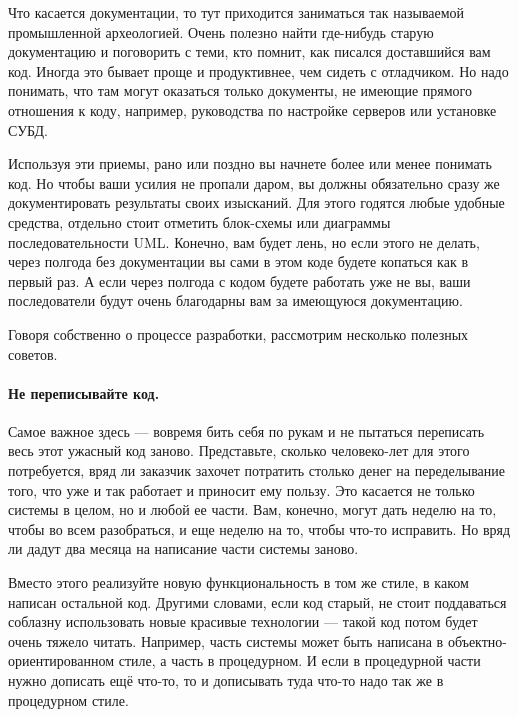 \documentclass{../../text-style}
\begin{document}
Что касается документации, то тут приходится заниматься так называемой промышленной археологией. Очень полезно найти где-нибудь старую документацию и поговорить с теми, кто помнит, как писался доставшийся вам код. Иногда это бывает проще и продуктивнее, чем сидеть с отладчиком. Но надо понимать, что там могут оказаться только документы, не имеющие прямого отношения к коду, например, руководства по настройке серверов или установке СУБД.

Используя эти приемы, рано или поздно вы начнете более или менее понимать код. Но чтобы ваши усилия не пропали даром, вы должны обязательно сразу же документировать результаты своих изысканий. Для этого годятся любые удобные средства, отдельно стоит отметить блок-схемы или диаграммы последовательности UML. Конечно, вам будет лень, но если этого не делать, через полгода без документации вы сами в этом коде будете копаться как в первый раз. А если через полгода с кодом будете работать уже не вы, ваши последователи будут очень благодарны вам за имеющуюся документацию.

Говоря собственно о процессе разработки, рассмотрим несколько полезных советов.

\paragraph{Не переписывайте код.} Самое важное здесь --- вовремя бить себя по рукам и не пытаться переписать весь этот ужасный код заново. Представьте, сколько человеко-лет для этого потребуется, вряд ли заказчик захочет потратить столько денег на переделывание того, что уже и так работает и приносит ему пользу. Это касается не только системы в целом, но и любой ее части. Вам, конечно, могут дать неделю на то, чтобы во всем разобраться, и еще неделю на то, чтобы что-то исправить. Но вряд ли дадут два месяца на написание части системы заново.

Вместо этого реализуйте новую функциональность в том же стиле, в каком написан остальной код. Другими словами, если код старый, не стоит поддаваться соблазну использовать новые красивые технологии --- такой код потом будет очень тяжело читать. Например, часть системы может быть написана в объектно-ориентированном стиле, а часть в процедурном. И если в процедурной части нужно дописать ещё что-то, то и дописывать туда что-то надо так же в процедурном стиле.
\end{document}
